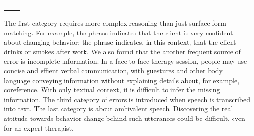 \begin{table}[!h]
\begin{center}
\begin{tabular}{ll}
& \\                                                                                                                                                                                                                                                             &                                                                                                                             \\ \hline
\bottomrule
\end{tabular}
\end{center}
\label{tbl:c_client_errors}
\end{table}

The first category requires more complex reasoning than just surface
form matching. For example, the phrase 
indicates that the client is very confident about changing behavior;
the phrase  indicates, in this context,
that the client drinks or smokes after work. We also found that the
another frequent source of error is incomplete information. In a
face-to-face therapy session, people may use concise and effient
verbal communication, with guestures and other body language conveying
information without explaining details about, for example,
coreference.  With only textual context, it is difficult to infer the
missing information. The third category of errors is introduced when
speech is transcribed into text. The last category is about ambivalent
speech. Discovering the real attitude towards behavior change behind
such utterances could be difficult, even for an expert therapist.
